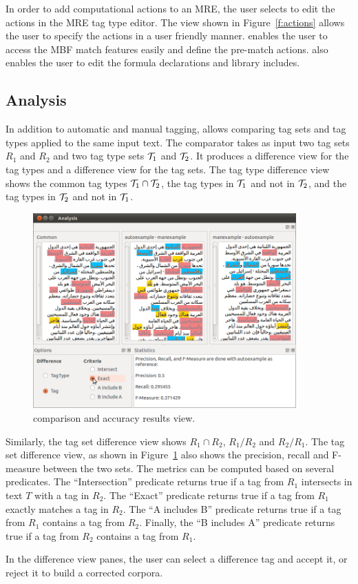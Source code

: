 In order to add computational actions to an MRE, 
the user selects to edit the actions in the MRE tag type editor. 
The view shown in Figure~\ref{f:actions} allows the user to specify 
the actions in a user friendly manner. 
\framework enables the user to access the MBF match features easily and define the pre-match actions. 
\framework also enables the user to edit the formula declarations and library includes.

\subsection{Analysis}
In addition to automatic and manual tagging, \framework 
allows comparing tag sets and tag types applied to the
same input text. 
The \framework comparator takes as input two tag sets $R_1$ and $R_2$ and 
two tag type sets ${\cal T}_1$ and ${\cal T}_2$. 
It produces a difference view for the tag types and 
a difference view for the tag sets. 
The tag type difference view shows the common tag types ${\cal T}_1 \cap {\cal T}_2$,
the tag types in ${\cal T}_1$ and not in ${\cal T}_2$, 
and the tag types in ${\cal T}_2$ and not in ${\cal T}_1$.

\begin{figure}[t]
  \centering
  \includegraphics[width=0.9\textwidth]{figures/diff}
  \caption{\framework comparison and accuracy results view.}
  \label{f:diff}
\end{figure}

Similarly, the tag set difference view shows $R_1\cap R_2$, $R_1/R_2$ and $R_2/R_1$. 
The tag set difference view, as shown in Figure~\ref{f:diff} also shows the precision, 
recall and F-measure between the two sets. 
The metrics can be computed based on several predicates. 
The ``Intersection'' predicate returns true if a tag from $R_1$ intersects in text $T$ 
with a tag in $R_2$. 
The ``Exact'' predicate returns true if a tag from $R_1$ exactly matches a tag
in $R_2$. 
The ``A includes B'' predicate returns true if a tag from $R_1$ contains a tag from $R_2$. 
Finally, the ``B includes A'' predicate returns true if a tag from $R_2$ contains 
a tag from $R_1$. 

In the difference view panes, the user can select a difference tag and accept it, or reject
it to build a corrected corpora. 